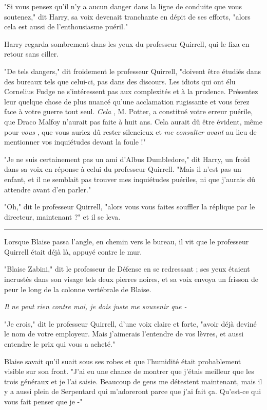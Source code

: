 "Si vous pensez qu'il n'y a aucun danger dans la ligne de conduite que vous soutenez," dit Harry, sa voix devenait tranchante en dépit de ses efforts, "alors cela est aussi de l'enthousiasme puéril."

Harry regarda sombrement dans les yeux du professeur Quirrell, qui le fixa en retour sans ciller.

"De tels dangers," dit froidement le professeur Quirrell, "doivent être étudiés dans des bureaux tels que celui-ci, pas dans des discours. Les idiots qui ont élu Cornelius Fudge ne s'intéressent pas aux complexités et à la prudence. Présentez leur quelque chose de plus nuancé qu'une acclamation rugissante et vous ferez face à votre guerre tout seul. \emph{Cela} , M. Potter, a constitué votre erreur puérile, que Draco Malfoy n'aurait pas faite à huit ans. Cela aurait dû être évident, même pour \emph{vous} , que vous auriez dû rester silencieux et \emph{me consulter avant } au lieu de mentionner vos inquiétudes devant la foule !"

"Je ne suis certainement pas un ami d'Albus Dumbledore," dit Harry, un froid dans sa voix en réponse à celui du professeur Quirrell. "Mais il n'est pas un enfant, et il ne semblait pas trouver mes inquiétudes puériles, ni que j'aurais dû attendre avant d'en parler."

"Oh," dit le professeur Quirrell, "alors vous vous faites souffler la réplique par le directeur, maintenant ?" et il se leva.
\par\noindent\rule{\textwidth}{0.4pt}
Lorsque Blaise passa l'angle, en chemin vers le bureau, il vit que le professeur Quirrell était déjà là, appuyé contre le mur.

"Blaise Zabini," dit le professeur de Défense en se redressant ; ses yeux étaient incrustés dans son visage tels deux pierres noires, et sa voix envoya un frisson de peur le long de la colonne vertébrale de Blaise.

\emph{Il ne peut rien contre moi, je dois juste me souvenir que -} 

"Je crois," dit le professeur Quirrell, d'une voix claire et forte, "avoir déjà deviné le nom de votre employeur. Mais j'aimerais l'entendre de vos lèvres, et aussi entendre le prix qui vous a acheté."

Blaise savait qu'il suait sous ses robes et que l'humidité était probablement visible sur son front. "J'ai eu une chance de montrer que j'étais meilleur que les trois généraux et je l'ai saisie. Beaucoup de gens me détestent maintenant, mais il y a aussi plein de Serpentard qui m'adoreront parce que j'ai fait ça. Qu'est-ce qui vous fait penser que je -"

